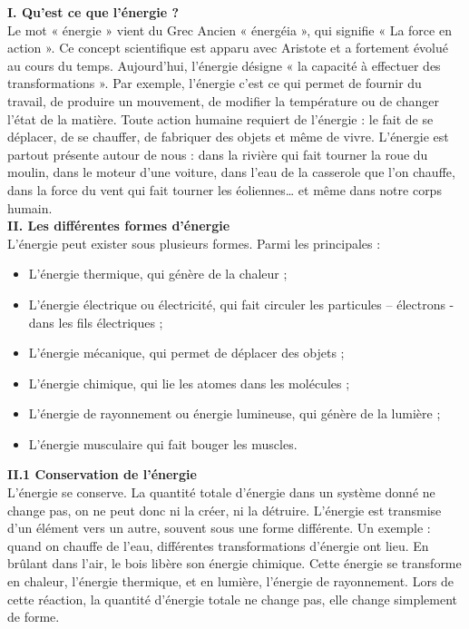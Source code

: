 \documentclass[8pt]{article}
\begin{document}
\textbf{I. Qu'est ce que l'énergie ?}\\

Le mot « énergie » vient du Grec Ancien « énergéia », qui signifie « La force en action ». Ce concept scientifique est apparu avec Aristote et a fortement évolué au cours du temps. Aujourd’hui, l’énergie désigne  « la capacité à effectuer des transformations ». Par exemple, l’énergie c’est ce qui permet de fournir du travail, de produire un mouvement, de modifier la température ou de changer l’état de la matière. Toute action humaine requiert de l’énergie : le fait de se déplacer, de se chauffer, de fabriquer des objets et même de vivre. 
 L’énergie est partout présente autour de nous : dans la rivière qui fait tourner la roue du moulin, dans le moteur d’une voiture, dans l’eau de la casserole que l’on chauffe, dans la force du vent qui fait tourner les éoliennes… et même dans notre corps humain.\\

\textbf{II. Les différentes formes d'énergie}\\

L’énergie peut exister sous plusieurs formes. Parmi les principales :

\begin{itemize}
	\setlength\itemsep{-0.2em}
	\item L’énergie thermique, qui génère de la chaleur ;
	\item L’énergie électrique ou électricité, qui fait circuler les particules – électrons - dans les fils électriques ;
	\item L’énergie mécanique, qui permet de déplacer des objets ;
	\item L’énergie chimique, qui lie les atomes dans les molécules ;
	\item L’énergie de rayonnement ou énergie lumineuse, qui génère de la lumière ;
	\item L’énergie musculaire qui fait bouger les muscles.
\end{itemize}

\textbf{II.1 Conservation de l'énergie}\\

L’énergie se conserve. La quantité totale d'énergie dans un système donné ne change pas, on ne peut donc ni la créer, ni la détruire. L'énergie est transmise d'un élément vers un autre, souvent sous une forme différente. 
Un exemple : quand on chauffe de l'eau, différentes transformations d’énergie ont lieu. En brûlant dans l’air, le bois libère son énergie chimique. Cette énergie se transforme en chaleur, l’énergie thermique, et en lumière, l’énergie de rayonnement. Lors de cette réaction, la quantité d'énergie totale ne change pas, elle change simplement de forme. \\
\end{document}
